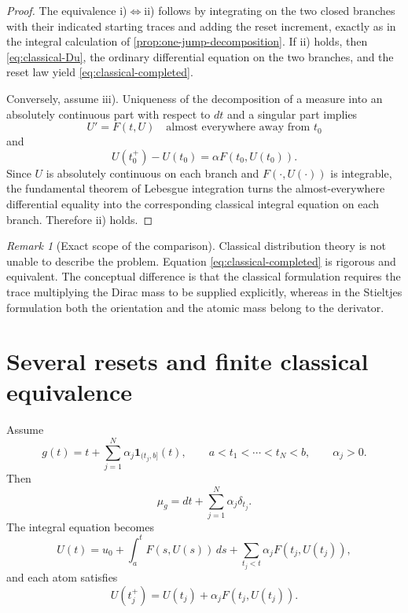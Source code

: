 \documentclass[preprint,12pt]{elsarticle}
\newenvironment{finalrevision}{\begingroup\color{red}}{\endgroup}
\newenvironment{finalrevision}{}{}
\theoremstyle{definition}
\theoremstyle{remark}
\newtheorem{remark}[theorem]{Remark}
\newcommand{\ind}{\mathbf 1}
\begin{document}
\begin{proof}
\begin{finalrevision}
The equivalence i)$\Leftrightarrow$ii) follows by integrating on the two
closed branches with their indicated starting traces and adding the reset
increment, exactly as in the integral calculation of
\cref{prop:one-jump-decomposition}. If ii) holds, then
\eqref{eq:classical-Du}, the ordinary differential equation on the two branches,
and the reset law yield \eqref{eq:classical-completed}.
\end{finalrevision}

Conversely, assume iii). Uniqueness of the decomposition of a measure into an absolutely continuous part with respect to $dt$ and a singular part implies
\[
 U'=F(t,U)\quad\text{almost everywhere away from }t_0
\]
and
\[
 U(t_0^+)-U(t_0)=\alpha F(t_0,U(t_0)).
\]
Since $U$ is absolutely continuous on each branch and $F(\cdot,U(\cdot))$ is integrable, the fundamental theorem of Lebesgue integration turns the almost-everywhere differential equality into the corresponding classical integral equation on each branch. Therefore ii) holds.
\end{proof}

\begin{remark}[Exact scope of the comparison]
Classical distribution theory is not unable to describe the problem. Equation \eqref{eq:classical-completed} is rigorous and equivalent. The conceptual difference is that the classical formulation requires the trace multiplying the Dirac mass to be supplied explicitly, whereas in the Stieltjes formulation both the orientation and the atomic mass belong to the derivator.
\end{remark}

\section{Several resets and finite classical equivalence}

Assume
\begin{equation}\label{eq:finite-jump-g}
 g(t)=t+\sum_{j=1}^{N}\alpha_j\ind_{(t_j,b]}(t),
 \qquad a<t_1<\cdots<t_N<b,
 \qquad \alpha_j>0.
\end{equation}
Then
\[
 \mu_g=dt+\sum_{j=1}^{N}\alpha_j\delta_{t_j}.
\]
The integral equation becomes
\begin{equation}\label{eq:multi-jump-integral}
 U(t)=u_0+\int_a^tF(s,U(s))\,ds
 +\sum_{t_j<t}\alpha_jF(t_j,U(t_j)),
\end{equation}
and each atom satisfies
\begin{equation}\label{eq:multi-reset}
 U(t_j^+)=U(t_j)+\alpha_jF(t_j,U(t_j)).
\end{equation}
\end{document}
